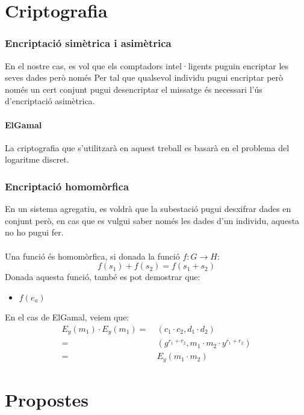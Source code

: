 \documentclass{article}
\begin{document}
\part{Criptografia}\label{part:criptografia}
\section{Encriptació simètrica i asimètrica}
En el nostre cas, es vol que els comptadors intel·ligents puguin encriptar les seves dades però només 
Per tal que qualsevol individu pugui encriptar però només un cert conjunt pugui desencriptar el missatge és necessari l'ús d'encriptació asimètrica.
\subsection{ElGamal}
La criptografia que s'utilitzarà en aquest treball es basarà en el problema del logaritme discret.
\section{Encriptació homomòrfica}
En un sistema agregatiu, es voldrà que la subestació pugui desxifrar dades en conjunt però, en cas que es vulgui saber només les dades d'un individu, aquesta no ho pugui fer.
\\\\
Una funció és homomòrfica, si donada la funció $f: G \rightarrow H$:
\[f(s_1) + f(s_2) = f(s_1+s_2)\]
Donada aquesta funció, també es pot demostrar que:
\begin{itemize}
	\item $f(e_a)$
\end{itemize}
En el cas de ElGamal, veiem que:
\begin{equation*}
\begin{aligned}
	E_y(m_1) \cdot E_y(m_1) =& \ (c_1 \cdot c_2, d_1 \cdot d_2)\\
	=& \ (g^{r_1 + r_2}, m_1 \cdot m_2 \cdot y^{r_1 + r_2} ) \\
	=& \ E_y(m_1 \cdot m_2)
\end{aligned}
\end{equation*}
\part{Propostes}\label{part:propostes}
\end{document}
